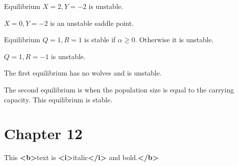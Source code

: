 \documentclass[]{memoir}
\newenvironment{Shaded}{}{}
\newcommand{\KeywordTok}[1]{\textcolor[rgb]{0.00,0.44,0.13}{\textbf{{#1}}}}
\newcommand{\NormalTok}[1]{{#1}}
\begin{document}

Equilibrium $X=2, Y=-2$ is unstable.

$X=0, Y=-2$ is an unstable saddle point.


Equilibrium $Q=1, R=1$ is stable if $\alpha \geq 0$. Otherwise it is
unstable.

$Q=1, R=-1$ is unstable.


The first equilibrium has no wolves and is unstable.

The second equilibrium is when the population size is equal to the
carrying capacity. This equilibrium is stable.

\section{Chapter 12}


\begin{Shaded}
\begin{Highlighting}[]
\NormalTok{This }\KeywordTok{<b>}\NormalTok{text is }\KeywordTok{<i>}\NormalTok{italic}\KeywordTok{</i>} \NormalTok{and bold.}\KeywordTok{</b>}
\end{Highlighting}
\end{Shaded}

\end{document}
